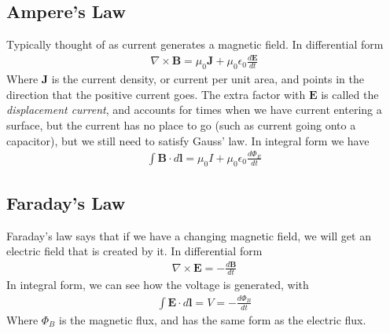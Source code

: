 \subsection{Ampere's Law}
Typically thought of as current generates a magnetic field. In differential form
\begin{align}
    \nabla\times\textbf{B} = \mu_0\textbf{J} +\mu_0\epsilon_0\frac{d\textbf{E}}{dt}
\end{align}
Where $\textbf{J}$ is the current density, or current per unit area, and points in the direction that the positive current goes. The extra factor with $\textbf{E}$ is called the \emph{displacement current}, and accounts for times when we have current entering a surface, but the current has no place to go (such as current going onto a capacitor), but we still need to satisfy Gauss' law. In integral form we have
\begin{align}
    \int \textbf{B}\cdot d\textbf{l} = \mu_0 I + \mu_0\epsilon_0\frac{d\Phi_E}{dt}
\end{align}



\subsection{Faraday's Law}
Faraday's law says that if we have a changing magnetic field, we will get an electric field that is created by it. In differential form
\begin{align}
    \nabla\times\textbf{E} = -\frac{d\textbf{B}}{dt}
\end{align}
In integral form, we can see how the voltage is generated, with
\begin{align}
    \int \textbf{E}\cdot d\textbf{l} = V =  -\frac{d\Phi_B}{dt}
\end{align}
Where $\Phi_B$ is the magnetic flux, and has the same form as the electric flux.


